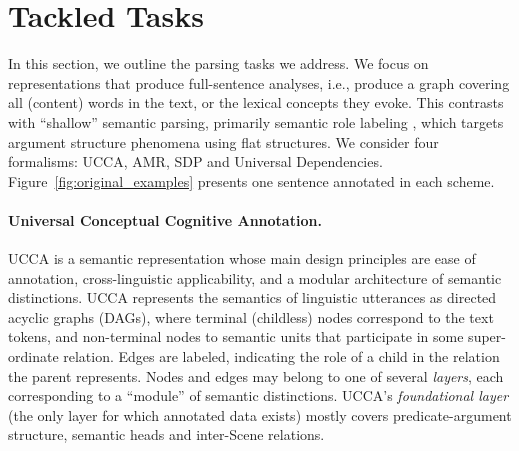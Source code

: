 \documentclass[11pt,a4paper]{article}
\newcommand{\oa}[1]{\footnote{\color{red}OA: #1}}
\begin{document}
\section{Tackled Tasks}\label{sec:tasks}

In this section, we outline the parsing tasks we address.
We focus on representations that produce full-sentence analyses,
i.e., produce a graph covering all (content) words in the text, 
or the lexical concepts they evoke.
This contrasts with ``shallow'' semantic parsing,
primarily semantic role labeling
\cite[SRL;][]{Palmer:05,gildea2002automatic,swayamdipta2017frame,ringgaard2017sling},
which targets argument structure phenomena using flat structures.
We consider four formalisms: UCCA, AMR, SDP and Universal Dependencies.
Figure~\ref{fig:original_examples} presents one sentence annotated in each scheme.


\paragraph{Universal Conceptual Cognitive Annotation.}\label{sec:ucca}
UCCA \cite{abend2013universal} is a semantic representation whose main design principles
are ease of annotation, cross-linguistic applicability, and a modular architecture of semantic distinctions.
UCCA represents the semantics of linguistic utterances
as directed acyclic graphs (DAGs), where terminal (childless) nodes
correspond to the text tokens, and non-terminal nodes to semantic units that participate
in some super-ordinate relation.
Edges are labeled, indicating the role of a child in the relation the parent represents.
Nodes and edges may belong to one of several \textit{layers}, each corresponding
to a ``module'' of semantic distinctions.
UCCA's \textit{foundational layer} (the only layer for which annotated data exists) 
mostly covers predicate-argument structure, semantic heads and inter-Scene relations.
\end{document}
